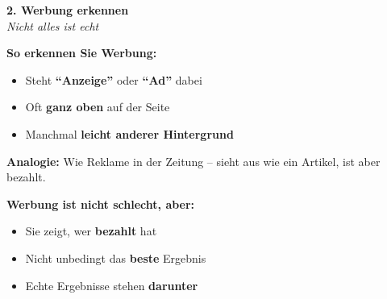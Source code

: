 \documentclass[a4paper,landscape,8pt]{extarticle}
\begin{document}
\hfill%
\begin{minipage}[t]{0.32\linewidth}
\begin{center}
\colorbox{warnred!10}{%
\begin{minipage}{0.95\linewidth}
\vspace{2mm}
\begin{center}
{\Large\bfseries\textcolor{warnred}{2. Werbung erkennen}}\\[1pt]
{\footnotesize\itshape Nicht alles ist echt}
\end{center}
\vspace{2mm}
\end{minipage}%
}
\end{center}

\vspace{1mm}

\textbf{So erkennen Sie Werbung:}
\begin{itemize}
\item Steht \textbf{``Anzeige''} oder \textbf{``Ad''} dabei
\item Oft \textbf{ganz oben} auf der Seite
\item Manchmal \textbf{leicht anderer Hintergrund}
\end{itemize}

\textbf{Analogie:} Wie Reklame in der Zeitung -- sieht aus wie ein Artikel, ist aber bezahlt.

\textbf{Werbung ist nicht schlecht, aber:}
\begin{itemize}
\item Sie zeigt, wer \textbf{bezahlt} hat
\item Nicht unbedingt das \textbf{beste} Ergebnis
\item Echte Ergebnisse stehen \textbf{darunter}
\end{itemize}

\vspace{2mm}

\end{minipage}%
\hfill%
\end{document}
